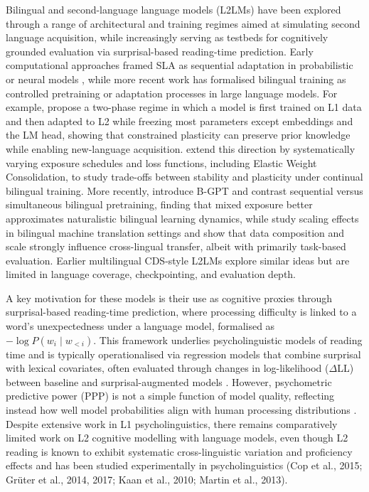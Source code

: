 Bilingual and second-language language models (L2LMs) have been explored through a range of architectural and training regimes aimed at simulating second language acquisition, while increasingly serving as testbeds for cognitively grounded evaluation via surprisal-based reading-time prediction. Early computational approaches framed SLA as sequential adaptation in probabilistic or neural models \citep{matusevych-etal-2013-computational}, while more recent work has formalised bilingual training as controlled pretraining or adaptation processes in large language models. For example, \citet{aoyama2024modeling} propose a two-phase regime in which a model is first trained on L1 data and then adapted to L2 while freezing most parameters except embeddings and the LM head, showing that constrained plasticity can preserve prior knowledge while enabling new-language acquisition. \citet{constantinescu2025investigating} extend this direction by systematically varying exposure schedules and loss functions, including Elastic Weight Consolidation, to study trade-offs between stability and plasticity under continual bilingual training. More recently, \citet{arnett-etal-2025-acquisition} introduce B-GPT and contrast sequential versus simultaneous bilingual pretraining, finding that mixed exposure better approximates naturalistic bilingual learning dynamics, while \citet{feng2026bilingual} study scaling effects in bilingual machine translation settings and show that data composition and scale strongly influence cross-lingual transfer, albeit with primarily task-based evaluation. Earlier multilingual CDS-style L2LMs \citep{yadavalli-etal-2023-slabert, oba-etal-2023-second} explore similar ideas but are limited in language coverage, checkpointing, and evaluation depth. 

A key motivation for these models is their use as cognitive proxies through surprisal-based reading-time prediction, where processing difficulty is linked to a word’s unexpectedness under a language model, formalised as $-\log P(w_i \mid w_{<i})$. This framework underlies psycholinguistic models of reading time and is typically operationalised via regression models that combine surprisal with lexical covariates, often evaluated through changes in log-likelihood ($\Delta$LL) between baseline and surprisal-augmented models \citep{wilcox2020predictive, kaye2025sentence}. However, psychometric predictive power (PPP) is not a simple function of model quality, reflecting instead how well model probabilities align with human processing distributions \citep{de-varda-marelli-2022-effects, goodkind-bicknell, demberg-keller, shain2019, shain2021, hoover2022}. Despite extensive work in L1 psycholinguistics, there remains comparatively limited work on L2 cognitive modelling with language models, even though L2 reading is known to exhibit systematic cross-linguistic variation and proficiency effects \citep{hillert1998sentence, meister2021revisiting, kuribayashi-etal-2021-lower} and has been studied experimentally in psycholinguistics (Cop et al., 2015; Grüter et al., 2014, 2017; Kaan et al., 2010; Martin et al., 2013). 

